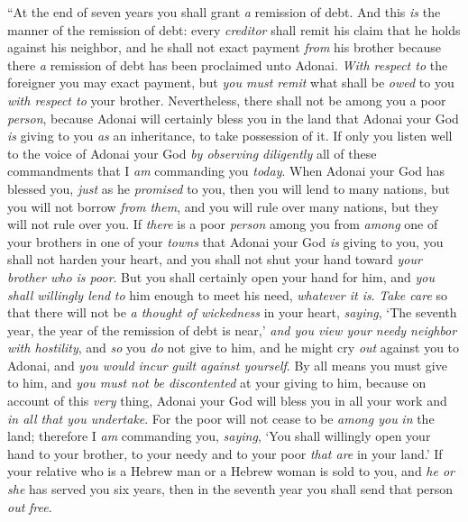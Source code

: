 \begin{biblechapter} %
\verse “At the end of seven years you shall grant \textit{a} remission of debt.
\verse And this \textit{is} the manner of the remission of debt: every \textit{creditor} shall remit his claim that he holds against his neighbor, and he shall not exact payment \textit{from} his brother because there \textit{a} remission of debt has been proclaimed unto Adonai.
\verse \textit{With respect to} the foreigner you may exact payment, but \textit{you must remit} what shall be \textit{owed} to you \textit{with respect to} your brother.
\verse Nevertheless, there shall not be among you a poor \textit{person}, because Adonai will certainly bless you in the land that Adonai your God \textit{is} giving to you \textit{as} an inheritance, to take possession of it.
\verse If only you listen well to the voice of Adonai your God \textit{by observing diligently} all of these commandments that I \textit{am} commanding you \textit{today}.
\verse When Adonai your God has blessed you, \textit{just} as he \textit{promised} to you, then you will lend to many nations, but you will not borrow \textit{from them}, and you will rule over many nations, but they will not rule over you.
\verse If \textit{there} is a poor \textit{person} among you from \textit{among} one of your brothers in one of your \textit{towns} that Adonai your God \textit{is} giving to you, you shall not harden your heart, and you shall not shut your hand toward \textit{your brother who is poor}.
\verse But you shall certainly open your hand for him, and \textit{you shall willingly lend} \textit{to} him enough to meet his need, \textit{whatever it is}.
\verse \textit{Take care} so that there will not be \textit{a thought of wickedness} in your heart, \textit{saying}, ‘The seventh year, the year of the remission of debt is near,’ \textit{and you view your needy neighbor with hostility}, and \textit{so} you \textit{do} not give to him, and he might cry \textit{out} against you to Adonai, and \textit{you would incur guilt against yourself}.
\verse By all means you must give to him, and \textit{you must not be discontented} at your giving to him, because on account of this \textit{very} thing, Adonai your God will bless you in all your work and \textit{in all that you undertake}.
\verse For the poor will not cease to be \textit{among you} \textit{in} the land; therefore I \textit{am} commanding you, \textit{saying}, ‘You shall willingly open your hand to your brother, to your needy and to your poor \textit{that are} in your land.’
\verse If your relative who is a Hebrew man or a Hebrew woman is sold to you, and \textit{he or she} has served you six years, then in the seventh year you shall send that person \textit{out} \textit{free}.

\end{biblechapter}
